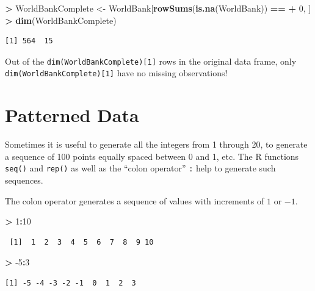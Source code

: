 \documentclass[]{krantz}
\makeatletter
\newenvironment{Shaded}{\begin{snugshade}}{\end{snugshade}}
\newcommand{\DecValTok}[1]{\textcolor[rgb]{0.06,0.06,0.06}{#1}}
\newcommand{\KeywordTok}[1]{\textcolor[rgb]{0.27,0.27,0.27}{\textbf{#1}}}
\newcommand{\NormalTok}[1]{#1}
\newcommand{\OperatorTok}[1]{\textcolor[rgb]{0.43,0.43,0.43}{\textbf{#1}}}
\newcommand{\StringTok}[1]{\textcolor[rgb]{0.5,0.5,0.5}{#1}}
\newenvironment{kframe}{%
\medskip{}
\setlength{\fboxsep}{.8em}
 \def\at@end@of@kframe{}%
 \ifinner\ifhmode%
  \def\at@end@of@kframe{\end{minipage}}%
  \begin{minipage}{\columnwidth}%
 \fi\fi%
 \def\FrameCommand##1{\hskip\@totalleftmargin \hskip-\fboxsep
 \colorbox{shadecolor}{##1}\hskip-\fboxsep
     \hskip-\linewidth \hskip-\@totalleftmargin \hskip\columnwidth}%
 \MakeFramed {\advance\hsize-\width
   \@totalleftmargin\z@ \linewidth\hsize
   \@setminipage}}%
 {\par\unskip\endMakeFramed%
 \at@end@of@kframe}
\renewenvironment{Shaded}{\begin{kframe}}{\end{kframe}}
\makeatother
\begin{document}
\begin{Shaded}
\begin{Highlighting}[]
\OperatorTok{>}\StringTok{ }\NormalTok{WorldBankComplete <-}\StringTok{ }\NormalTok{WorldBank[}\KeywordTok{rowSums}\NormalTok{(}\KeywordTok{is.na}\NormalTok{(WorldBank)) }\OperatorTok{==}\StringTok{ }
\OperatorTok{+}\StringTok{   }\DecValTok{0}\NormalTok{, ]}
\OperatorTok{>}\StringTok{ }\KeywordTok{dim}\NormalTok{(WorldBankComplete)}
\end{Highlighting}
\end{Shaded}

\begin{verbatim}
[1] 564  15
\end{verbatim}

Out of the \texttt{dim(WorldBankComplete){[}1{]}} rows in the original data frame, only \texttt{dim(WorldBankComplete){[}1{]}} have no missing observations!

\hypertarget{patterned-data}{%
\section{Patterned Data}\label{patterned-data}}

Sometimes it is useful to generate all the integers from 1 through 20, to generate a sequence of 100 points equally spaced between 0 and 1, etc. The R functions \texttt{seq()} and \texttt{rep()} as well as the ``colon operator'' \texttt{:} help to generate such sequences.

The colon operator generates a sequence of values with increments of \(1\) or \(-1\).

\begin{Shaded}
\begin{Highlighting}[]
\OperatorTok{>}\StringTok{ }\DecValTok{1}\OperatorTok{:}\DecValTok{10}
\end{Highlighting}
\end{Shaded}

\begin{verbatim}
 [1]  1  2  3  4  5  6  7  8  9 10
\end{verbatim}

\begin{Shaded}
\begin{Highlighting}[]
\OperatorTok{>}\StringTok{ }\DecValTok{-5}\OperatorTok{:}\DecValTok{3}
\end{Highlighting}
\end{Shaded}

\begin{verbatim}
[1] -5 -4 -3 -2 -1  0  1  2  3
\end{verbatim}
\end{document}
